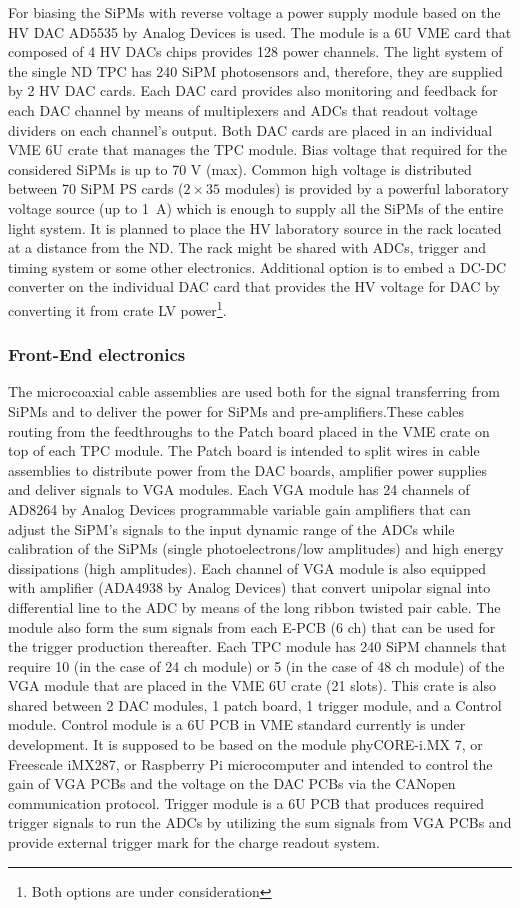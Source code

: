 For biasing the SiPMs with reverse voltage a power supply module based on the HV DAC AD5535 by Analog Devices is used. The module is a 6U VME card that composed of 4 HV DACs chips provides 128 power channels.  The light system of the single ND TPC has 240 SiPM photosensors and, therefore, they are supplied by 2 HV DAC cards. Each DAC card provides also monitoring and feedback for each DAC channel by means of multiplexers and ADCs that readout voltage dividers on each channel's output. Both DAC cards are placed in an individual VME 6U crate that manages the TPC module. Bias voltage that required for the considered SiPMs is up to 70 V (max). Common high voltage is distributed between 70 SiPM PS cards ($2\times35$ modules) is provided by a powerful laboratory voltage source (up to 1~A) which is enough to supply all the SiPMs of the entire light system. It is planned to place the HV laboratory source in the rack located at a distance from the ND. The rack might be shared with ADCs, trigger and timing system or some other electronics. Additional option is to embed a DC-DC converter  on the individual DAC card that provides the HV voltage for DAC by converting it from crate LV power\footnote{Both options are under consideration}.

\subsubsection{Front-End electronics}

The microcoaxial cable assemblies are used both for the signal transferring from SiPMs and to deliver the power for SiPMs and pre-amplifiers.These cables routing from the feedthroughs to the Patch board placed in the VME crate on top of each TPC module.  The Patch board is intended to split wires in cable assemblies to distribute power from the DAC boards, amplifier power supplies and deliver signals to VGA modules. Each VGA module has 24 channels of AD8264 by Analog Devices programmable variable gain amplifiers that can adjust the SiPM's signals to the input dynamic range of the ADCs while calibration of the SiPMs (single photoelectrons/low amplitudes) and high energy dissipations (high amplitudes). Each channel of VGA module is also equipped with  amplifier (ADA4938 by Analog Devices) that convert unipolar signal into differential line to the ADC by means of the long ribbon twisted pair cable. The module also form the sum signals from each E-PCB (6 ch)  that can be used for the  trigger production thereafter. Each TPC module has 240 SiPM channels that require 10 (in the case of 24 ch module) or 5 (in the case of 48 ch module) of the VGA module that are placed in the VME 6U crate (21 slots). This crate is also shared between 2 DAC modules, 1 patch board, 1 trigger module, and a Control module. Control module is a 6U PCB in VME standard currently is under development. It is supposed to be based on the module phyCORE-i.MX 7, or Freescale iMX287, or Raspberry Pi microcomputer and intended to control the gain of VGA PCBs and the voltage on the DAC PCBs via the CANopen communication protocol. Trigger module is a  6U PCB that produces required trigger signals to run the ADCs by utilizing the sum signals from VGA PCBs and provide external trigger mark for the charge readout system.

